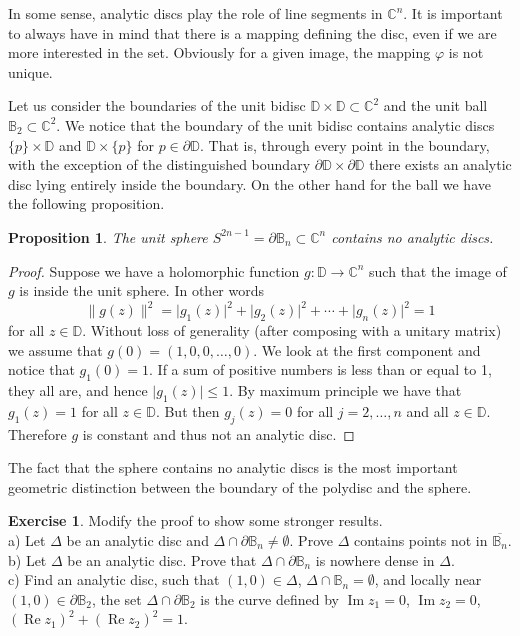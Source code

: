 \documentclass[12pt,openany]{book}
\renewcommand{\Re}{\operatorname{Re}}
\renewcommand{\Im}{\operatorname{Im}}
\newcommand{\sabs}[1]{\lvert {#1} \rvert}
\newcommand{\snorm}[1]{\lVert {#1} \rVert}
\newcommand{\C}{{\mathbb{C}}}
\newcommand{\D}{{\mathbb{D}}}
\newcommand{\bB}{{\mathbb{B}}}
\newcommand{\bD}{{\mathbb{D}}}
\theoremstyle{plain}
\newtheorem{prop}[thm]{Proposition}
\theoremstyle{remark}
\theoremstyle{definition}
\newenvironment{exbox}{%
    \def\FrameCommand{\vrule width 1pt \relax\hspace {10pt}}%
    \MakeFramed {\advance \hsize -\width \FrameRestore }%
}{%
    \endMakeFramed
}
\theoremstyle{exercise}
\newtheorem{exercise}{Exercise}[section]
\theoremstyle{example}
\begin{document}
In some sense, analytic discs play the role of line segments in $\C^n$.  It
is important to always have in mind that there is a mapping defining the
disc, even if we are more interested in the set.  Obviously for a given
image, the mapping $\varphi$ is not unique.

Let us consider the boundaries of 
the unit bidisc $\bD \times \bD \subset \C^2$
and the unit ball $\bB_2 \subset \C^2$.  We notice that the boundary
of the unit bidisc contains analytic discs $\{p\} \times \bD$
and $\bD \times \{p\}$ for $p \in \partial \bD$.  That is, through
every point in the boundary, with the exception of the distinguished
boundary $\partial \D \times \partial \D$ there exists an analytic disc
lying entirely inside the boundary.  On the other hand for the ball
we have the following proposition.

\begin{prop}
The unit sphere $S^{2n-1} = \partial \bB_n \subset \C^n$ 
contains no analytic discs.
\end{prop}

\begin{proof}
Suppose we have a holomorphic function $g \colon \D \to \C^n$
such that the image of $g$ is inside the unit sphere.  In other words
\begin{equation*}
\snorm{g(z)}^2 = \sabs{g_1(z)}^2 + \sabs{g_2(z)}^2 + \cdots + \sabs{g_n(z)}^2 = 1
\end{equation*}
for all $z \in \D$.  Without loss of generality (after composing with a
unitary matrix) we assume that
$g(0) = (1,0,0,\ldots,0)$.  We look at the first component
and notice that $g_1(0) = 1$.  If a sum of
positive numbers is less than or equal to 1,
they all are, and hence $\sabs{g_1(z)} \leq 1$.  By maximum principle
we have that $g_1(z) = 1$ for all $z \in \D$.  But then $g_j(z) = 0$
for all $j=2,\ldots,n$ and all $z \in \D$.  Therefore $g$ is constant and
thus not an analytic disc.
\end{proof}

The fact that the sphere contains no analytic discs
is the most important geometric distinction between the boundary of
the polydisc and the sphere.

\begin{exbox}
\begin{exercise}
Modify the proof to show some stronger results.\\
a) Let $\Delta$ be an analytic disc
and $\Delta \cap \partial \bB_n \not= \emptyset$.
Prove $\Delta$ contains points not in
$\overline{\bB_n}$.\\
b) Let $\Delta$ be an analytic disc.
Prove that $\Delta \cap \partial \bB_n$ is nowhere dense in $\Delta$.\\
c) Find an analytic disc, such that $(1,0) \in \Delta$, $\Delta \cap \bB_n =
\emptyset$, and 
locally near
$(1,0) \in \partial \bB_2$, the set
$\Delta \cap \partial \bB_2$ is the
curve defined by $\Im z_1=0$, $\Im z_2=0$,
$(\Re z_1)^2+ (\Re z_2)^2 = 1$.
\end{exercise}
\end{exbox}
\end{document}
